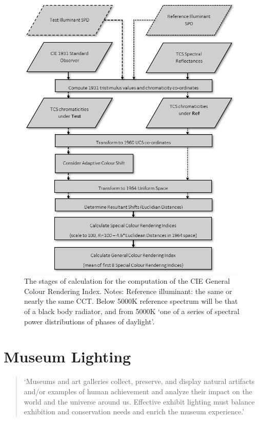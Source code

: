 \begin{figure}[htbp]
\includegraphics[max width=\textwidth]{figs/LitRev/criflow.png}
\caption{The stages of calculation for the computation of the CIE General Colour Rendering Index. Notes: Reference illuminant: the same or nearly the same \gls{CCT}. Below 5000K reference spectrum will be that of a black body radiator, and from 5000K `one of a series of spectral power distributions of phases of daylight'.}
\label{fig:criflow}
\end{figure}


\section{Museum Lighting}

\begin{quote}
`Museums and art galleries collect, preserve, and display natural artifacts and/or examples of human achievement and analyze their impact on the world and the universe around us. Effective exhibit lighting must balance exhibition and conservation needs and enrich the museum experience.'
\end{quote}

